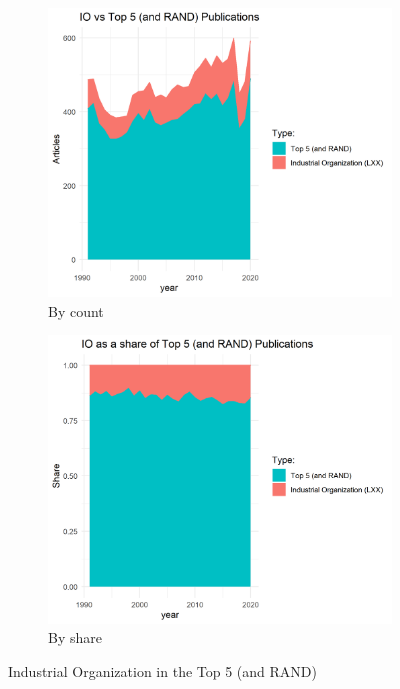 \documentclass[11pt, letterpaper, twoside]{article}
\begin{document}
\begin{figure}[!ht]
    \begin{subfigure}[h]{0.49\textwidth}
        \centering
        \includegraphics[width=\textwidth]{LXX-code-share-area.png}
        \caption{By count}
    \end{subfigure}
    \hfill
    \begin{subfigure}[h]{0.49\textwidth}
        \centering
        \includegraphics[width=\textwidth]{LXX-code-share-area-normalized.png}
        \caption{By share}
    \end{subfigure}
    \caption{Industrial Organization in the Top 5 (and RAND)}
\end{figure}
\end{document}
